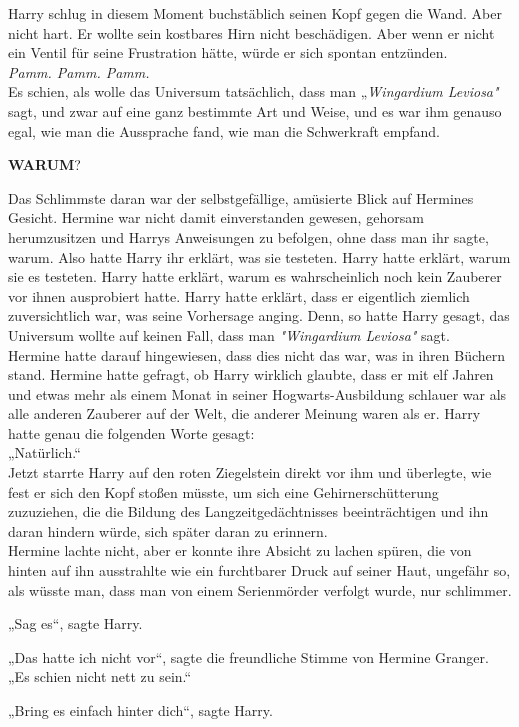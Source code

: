 {Harry schlug in diesem Moment buchstäblich seinen Kopf gegen die Wand. Aber nicht hart. Er wollte sein kostbares Hirn nicht beschädigen. Aber wenn er nicht ein Ventil für seine Frustration hätte, würde er sich spontan entzünden.\\ \emph{Pamm. Pamm. Pamm.}\\ Es schien, als wolle das Universum tatsächlich, dass man „\emph{Wingardium Leviosa"} sagt, und zwar auf eine ganz bestimmte Art und Weise, und es war ihm genauso egal, wie man die Aussprache fand, wie man die Schwerkraft empfand.

\textbf{WARUM}?

Das Schlimmste daran war der selbstgefällige, amüsierte Blick auf Hermines Gesicht. Hermine war nicht damit einverstanden gewesen, gehorsam herumzusitzen und Harrys Anweisungen zu befolgen, ohne dass man ihr sagte, warum. Also hatte Harry ihr erklärt, was sie testeten. Harry hatte erklärt, warum sie es testeten. Harry hatte erklärt, warum es wahrscheinlich noch kein Zauberer vor ihnen ausprobiert hatte. Harry hatte erklärt, dass er eigentlich ziemlich zuversichtlich war, was seine Vorhersage anging. Denn, so hatte Harry gesagt, das Universum wollte auf keinen Fall, dass man \emph{"Wingardium Leviosa"} sagt.\\ Hermine hatte darauf hingewiesen, dass dies nicht das war, was in ihren Büchern stand. Hermine hatte gefragt, ob Harry wirklich glaubte, dass er mit elf Jahren und etwas mehr als einem Monat in seiner Hogwarts-Ausbildung schlauer war als alle anderen Zauberer auf der Welt, die anderer Meinung waren als er. Harry hatte genau die folgenden Worte gesagt:\\ „Natürlich.“\\ Jetzt starrte Harry auf den roten Ziegelstein direkt vor ihm und überlegte, wie fest er sich den Kopf stoßen müsste, um sich eine Gehirnerschütterung zuzuziehen, die die Bildung des Langzeitgedächtnisses beeinträchtigen und ihn daran hindern würde, sich später daran zu erinnern.\\ Hermine lachte nicht, aber er konnte ihre Absicht zu lachen spüren, die von hinten auf ihn ausstrahlte wie ein furchtbarer Druck auf seiner Haut, ungefähr so, als wüsste man, dass man von einem Serienmörder verfolgt wurde, nur schlimmer.

„Sag es“, sagte Harry.

„Das hatte ich nicht vor“, sagte die freundliche Stimme von Hermine Granger. „Es schien nicht nett zu sein.“

„Bring es einfach hinter dich“, sagte Harry.

}
